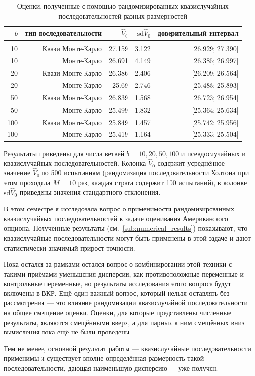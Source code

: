 \documentclass[specialist,
               substylefile = ../spbu.rtx,
               subf,href,colorlinks=true, 12pt]{disser}
\newcommand{\Vhat}{\hat{V}}
\begin{document}
\begin{table}
	\renewcommand{\arraystretch}{0.6}
	\centering
	\caption{Оценки, полученные с помощью рандомизированных квазислучайных последовательностей разных размерностей}
	\begin{tabular}{rrrrr}
		$b$&тип последовательности&$\Vhat_0$&$\mathrm{sd}\Vhat_0$&доверительный интервал\\[5pt]\hline\\
		10&Квази Монте-Карло&27.159&3.122&[26.929; 27.390]\\
		10&Монте-Карло&26.691&4.149&[26.385; 26.997]\\[5pt]
		20&Квази Монте-Карло&26.386&2.406&[26.209; 26.564]\\
		20&Монте-Карло&25.69&2.746&[25.488; 25.893]\\[5pt]
		50&Квази Монте-Карло&26.839&1.568&[26.723; 26.954]\\
		50&Монте-Карло&25.499&1.832&[25.364; 25.634]\\[5pt]
		100&Квази Монте-Карло&25.849&1.457&[25.742; 25.956]\\
		100&Монте-Карло&25.419&1.164&[25.333; 25.504]\\[10pt]
	\end{tabular}
	\label{tbl:quasi_vs_common_mc}

	\footnotesize
	Результаты приведены для числа ветвей $b = 10, 20, 50, 100$ и псевдослучайных и квазислучайных последовательностей. Колонка $\Vhat_0$ содержит усреднённое значение $\Vhat_0$ по 500 испытаниям (рандомизация последовательности Холтона при этом проходила $M = 10$ раз, каждая страта содержит 100 испытаний), в колонке $\mathrm{sd}\Vhat_0$ приведены значения стандартного отклонения.
\end{table}




\conclusion

В этом семестре я исследовала вопрос о применимости рандомизированных квазислучайных последовательностей к задаче оценивания Американского опциона. Полученные результаты (см.~\ref{sub:numerical_results}) показывают, что квазислучайные последовательности могут быть применены в этой задаче и дают статистически значимый прирост точности. 

Пока остался за рамками остался вопрос о комбинировании этой техники с такими приёмами уменьшения дисперсии, как противоположные переменные и контрольные переменные, но результаты исследования этого вопроса будут включены в ВКР. Ещё один важный вопрос, который нельзя оставлять без рассмотрения --- это влияние рандомизации квазислучайной последовательности на общее смещение оценки. Оценки, для которые представлены численные результаты, являются смещёнными вверх, а для парных к ним смещённых вниз вычисления пока ещё не были проведены.

Тем не менее, основной результат работы --- квазислучайные последовательности применимы и существует вполне определённая размерность такой последовательности, дающая наименьшую дисперсию --- уже получен.

\printbibliography
\end{document}
